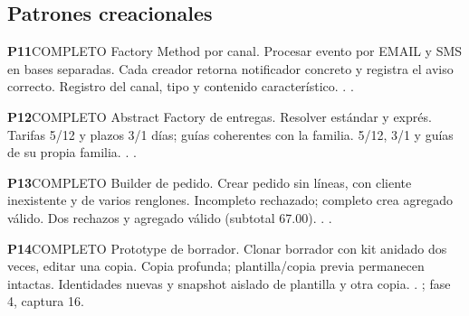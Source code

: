\subsection*{Patrones creacionales}
\par\medskip\noindent\begin{minipage}{\linewidth}
\noindent\textbf{\large P11}\quad\textsf{COMPLETO}
 Factory Method por canal.
 Procesar evento por EMAIL y SMS en bases separadas.
 Cada creador retorna notificador concreto y registra el aviso correcto.
 Registro del canal, tipo y contenido característico.
 . .
\end{minipage}\par
\par\medskip\noindent\begin{minipage}{\linewidth}
\noindent\textbf{\large P12}\quad\textsf{COMPLETO}
 Abstract Factory de entregas.
 Resolver estándar y exprés.
 Tarifas 5/12 y plazos 3/1 días; guías coherentes con la familia.
 5/12, 3/1 y guías de su propia familia.
 . .
\end{minipage}\par
\par\medskip\noindent\begin{minipage}{\linewidth}
\noindent\textbf{\large P13}\quad\textsf{COMPLETO}
 Builder de pedido.
 Crear pedido sin líneas, con cliente inexistente y de varios renglones.
 Incompleto rechazado; completo crea agregado válido.
 Dos rechazos y agregado válido (subtotal 67.00).
 . .
\end{minipage}\par
\par\medskip\noindent\begin{minipage}{\linewidth}
\noindent\textbf{\large P14}\quad\textsf{COMPLETO}
 Prototype de borrador.
 Clonar borrador con kit anidado dos veces, editar una copia.
 Copia profunda; plantilla/copia previa permanecen intactas.
 Identidades nuevas y snapshot aislado de plantilla y otra copia.
 . ; fase 4, captura 16.
\end{minipage}\par
